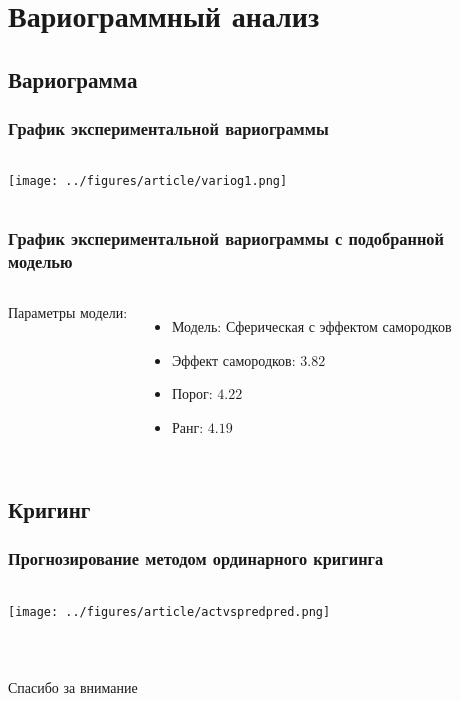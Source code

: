 \documentclass[10pt,pdf,aspectratio=169]{beamer}
\begin{document}
\section{Вариограммный анализ}

\subsection{Вариограмма}

\begin{frame}
  \frametitle{График экспериментальной вариограммы}   %
   \begin{columns}[c]
   \column{4.5in}
  \texttt{[image: ../figures/article/variog1.png]}
  \end{columns}
\end{frame}

\begin{frame}
  \frametitle{График экспериментальной вариограммы с подобранной моделью}   %
  \begin{columns}[c]
  \column{2in}  %
  Параметры модели:
  \begin{itemize}
  \item Модель: Сферическая с эффектом самородков
  \item Эффект самородков: $3.82$
  \item Порог: $4.22$
  \item Ранг: $4.19$
  \end{itemize}
  \column{3in}
  \end{columns}
\end{frame}

\subsection{Кригинг}
\begin{frame}
  \frametitle{Прогнозирование методом ординарного кригинга}   %
   \begin{columns}[c]
   \column{4.5in}
  \texttt{[image: ../figures/article/actvspredpred.png]}
  \end{columns}
\end{frame}

\subsection{}
\begin{frame}
  \frametitle{}   %
   \begin{columns}[c]
   \column{1.3in}
  Спасибо за внимание
  \end{columns}
\end{frame}
\end{document}
